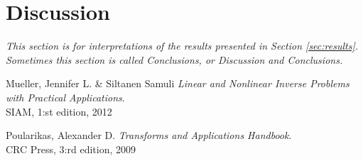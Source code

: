 \documentclass[12pt,a4]{article}
\begin{document}
\section{Discussion}

{\em This section is for interpretations of the results presented in Section \ref{sec:results}. Sometimes this section is called Conclusions, or Discussion and Conclusions.}

 \newpage

\begin{thebibliography}{9}
	Mueller, Jennifer L. \& Siltanen Samuli \emph{Linear and Nonlinear Inverse Problems with Practical Applications}.\\
	SIAM, 1:st edition, 2012

    Poularikas, Alexander D. \emph{Transforms and Applications Handbook}.\\
    CRC Press, 3:rd edition, 2009 

\end{thebibliography}
\end{document}
